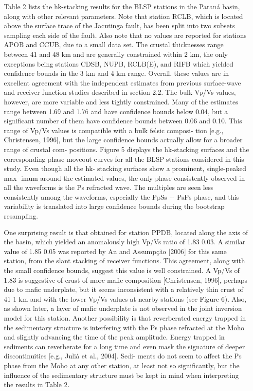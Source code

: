 \documentclass[long]{geophysics}
\begin{document}
Table 2 lists the hk-stacking results for the BLSP
stations in the Paraná basin, along with other relevant
parameters. Note that station RCLB, which is located above
the surface trace of the Jacutinga fault, has been split into
two subsets sampling each side of the fault. Also note that
no values are reported for stations APOB and CCUB, due to
a small data set. The crustal thicknesses range between 41
and 48 km and are generally constrained within 2 km, the
only exceptions being stations CDSB, NUPB, RCLB(E),
and RIFB which yielded confidence bounds in the 3 km
and 4 km range. Overall, these values are in excellent
agreement with the independent estimates from previous
surface-wave and receiver function studies described in
section 2.2. The bulk Vp/Vs values, however, are more
variable and less tightly constrained. Many of the estimates
range between 1.69 and 1.76 and have confidence bounds
below 0.04, but a significant number of them have
confidence bounds between 0.06 and 0.10. This range
of Vp/Vs values is compatible with a bulk felsic composi-
tion [e.g., Christensen, 1996], but the large confidence
bounds actually allow for a broader range of crustal com-
positions. Figure 5 displays the hk-stacking surfaces and
the corresponding phase moveout curves for all the BLSP
stations considered in this study. Even though all the hk-
stacking surfaces show a prominent, single-peaked max-
imum around the estimated values, the only phase
consistently observed in all the waveforms is the Ps
refracted wave. The multiples are seen less consistently
among the waveforms, especially the PpSs + PsPs phase,
and this variability is translated into large confidence
bounds during the bootstrap resampling.

One surprising result is that obtained for station
PPDB, located along the axis of the basin, which yielded
an anomalously high Vp/Vs ratio of 1.83 0.03. A
similar value of 1.85  0.05 was reported by An and
Assumpção [2006] for this same station, from the slant
stacking of receiver functions. This agreement, along with the small confidence bounds, suggest this value is
well constrained. A Vp/Vs of 1.83 is suggestive of crust
of more mafic composition [Christensen, 1996], perhaps
due to mafic underplate, but it seems inconsistent with a
relatively thin crust of 41 1 km and with the lower
Vp/Vs values at nearby stations (see Figure 6). Also, as
shown later, a layer of mafic underplate is not observed
in the joint inversion model for this station. Another
possibility is that reverberated energy trapped in the
sedimentary structure is interfering with the Ps phase
refracted at the Moho and slightly advancing the time of
the peak amplitude. Energy trapped in sediments can
reverberate for a long time and even mask the signature
of deeper discontinuities [e.g., Julià et al., 2004]. Sedi-
ments do not seem to affect the Ps phase from the Moho
at any other station, at least not so significantly, but the
influence of the sedimentary structure must be kept in
mind when interpreting the results in Table 2.
\end{document}
